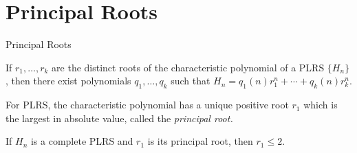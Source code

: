\documentclass{beamer}
\begin{document}
\section{Principal Roots}
\begin{frame}{Principal Roots}
    \begin{theorem}
    If $r_1, \ldots, r_k$ are the distinct roots of the characteristic polynomial of a PLRS $\{H_n\}$, then there exist polynomials $q_1,\ldots, q_k$ such that $ H_n = q_1(n)r_1^n+ \cdots +q_k(n)r_k^n$.
    \end{theorem}
    \pause
    For PLRS, the characteristic polynomial has a unique positive root $r_1$ which is the largest in absolute value, called the \emph{principal root.} 
    \pause
    \begin{theorem}[SMALL 2020]
        If $H_n$ is a complete PLRS and $r_1$ is its principal root, then $r_1\leq 2$.
    \end{theorem}
        
\end{frame}
\end{document}

